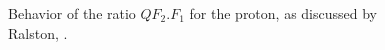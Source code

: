 \begin{figure}
\begin{center}
\caption{Behavior of the ratio $QF_2.F_1$ for the proton, as discussed by Ralston, \cite{jain}.}
\label{fig:pf2f1p}
\end{center}
\end{figure}

